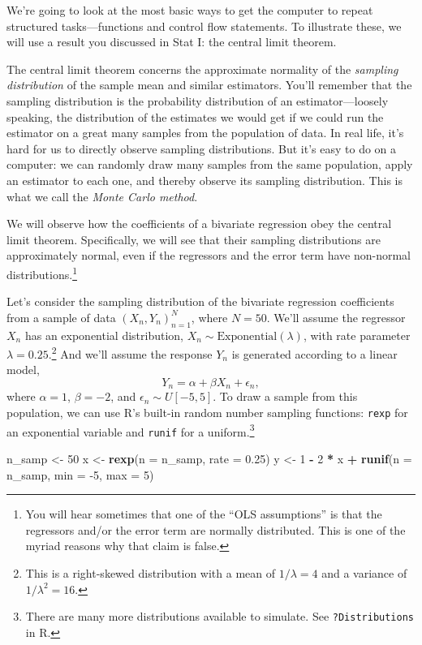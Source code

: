 \documentclass[
  12pt,
  oneside,openany]{book}
\newenvironment{Shaded}{\begin{snugshade}}{\end{snugshade}}
\newcommand{\DataTypeTok}[1]{\textcolor[rgb]{0.13,0.29,0.53}{#1}}
\newcommand{\DecValTok}[1]{\textcolor[rgb]{0.00,0.00,0.81}{#1}}
\newcommand{\FloatTok}[1]{\textcolor[rgb]{0.00,0.00,0.81}{#1}}
\newcommand{\KeywordTok}[1]{\textcolor[rgb]{0.13,0.29,0.53}{\textbf{#1}}}
\newcommand{\NormalTok}[1]{#1}
\newcommand{\OperatorTok}[1]{\textcolor[rgb]{0.81,0.36,0.00}{\textbf{#1}}}
\newcommand{\StringTok}[1]{\textcolor[rgb]{0.31,0.60,0.02}{#1}}
\begin{document}
We're going to look at the most basic ways to get the computer to repeat structured tasks---functions and control flow statements. To illustrate these, we will use a result you discussed in Stat I: the central limit theorem.

The central limit theorem concerns the approximate normality of the \emph{sampling distribution} of the sample mean and similar estimators.
You'll remember that the sampling distribution is the probability distribution of an estimator---loosely speaking, the distribution of the estimates we would get if we could run the estimator on a great many samples from the population of data.
In real life, it's hard for us to directly observe sampling distributions.
But it's easy to do on a computer: we can randomly draw many samples from the same population, apply an estimator to each one, and thereby observe its sampling distribution.
This is what we call the \emph{Monte Carlo method}.

We will observe how the coefficients of a bivariate regression obey the central limit theorem.
Specifically, we will see that their sampling distributions are approximately normal, even if the regressors and the error term have non-normal distributions.\footnote{You will hear sometimes that one of the ``OLS assumptions'' is that the regressors and/or the error term are normally distributed. This is one of the myriad reasons why that claim is false.}

Let's consider the sampling distribution of the bivariate regression coefficients from a sample of data \((X_n, Y_n)_{n=1}^N\), where \(N = 50\).
We'll assume the regressor \(X_n\) has an exponential distribution, \(X_n \sim \text{Exponential}(\lambda)\), with rate parameter \(\lambda = 0.25\).\footnote{This is a right-skewed distribution with a mean of \(1 / \lambda = 4\) and a variance of \(1 / \lambda^2 = 16\).}
And we'll assume the response \(Y_n\) is generated according to a linear model, \[Y_n = \alpha + \beta X_n + \epsilon_n,\] where \(\alpha = 1\), \(\beta = -2\), and \(\epsilon_n \sim U[-5, 5]\).
To draw a sample from this population, we can use R's built-in random number sampling functions: \texttt{rexp} for an exponential variable and \texttt{runif} for a uniform.\footnote{There are many more distributions available to simulate. See \texttt{?Distributions} in R.}

\begin{Shaded}
\begin{Highlighting}[]
\NormalTok{n\_samp <{-}}\StringTok{ }\DecValTok{50}
\NormalTok{x <{-}}\StringTok{ }\KeywordTok{rexp}\NormalTok{(}\DataTypeTok{n =}\NormalTok{ n\_samp, }\DataTypeTok{rate =} \FloatTok{0.25}\NormalTok{)}
\NormalTok{y <{-}}\StringTok{ }\DecValTok{1} \OperatorTok{{-}}\StringTok{ }\DecValTok{2} \OperatorTok{*}\StringTok{ }\NormalTok{x }\OperatorTok{+}\StringTok{ }\KeywordTok{runif}\NormalTok{(}\DataTypeTok{n =}\NormalTok{ n\_samp, }\DataTypeTok{min =} \DecValTok{{-}5}\NormalTok{, }\DataTypeTok{max =} \DecValTok{5}\NormalTok{)}
\end{Highlighting}
\end{Shaded}
\end{document}
